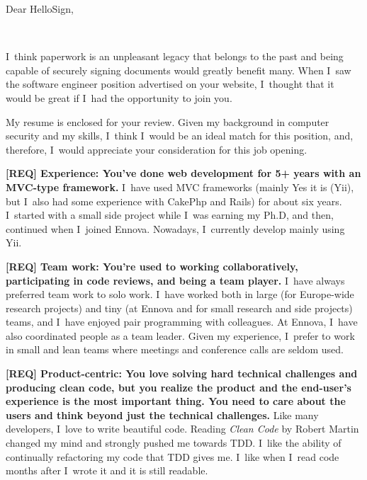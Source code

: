 \documentclass[a4paper,sans]{moderncv} %
\begin{document}
\recipient{~}{~} %
\date{\today} %
\opening{Dear HelloSign,} %
\closing {~}

\makelettertitle %

\justify

I~think paperwork is an unpleasant legacy that belongs to the past and being capable of securely signing documents would greatly benefit many. When I~saw the software engineer position advertised on your website, I~thought that it would be great if I~had the opportunity to join you.

My resume is enclosed for your review. Given my background in computer security and my skills, I~think I~would be an ideal match for this position, and, therefore, I~would appreciate your consideration for this job opening.

\textbf{[REQ] Experience: You’ve done web development for 5+ years with an MVC-type framework.}
I~have used MVC frameworks (mainly Yes it is (Yii), but I~also had some experience with CakePhp and Rails) for about six years. I~started with a small side project while I~was earning my Ph.D, and then, continued when I~joined Ennova. Nowadays, I~currently develop mainly using Yii.

\textbf{[REQ] Team work: You’re used to working collaboratively, participating in code reviews, and being a team player.}
I~have always preferred team work to solo work. I~have worked both in large (for Europe-wide research projects) and tiny (at Ennova and for small research and side projects) teams, and I~have enjoyed pair programming with colleagues. At Ennova, I~have also coordinated people as a team leader.
Given my experience, I~prefer to work in small and lean teams where meetings and conference calls are seldom used.

\textbf{[REQ] Product-centric: You love solving hard technical challenges and producing clean code, but you realize the product and the end-user’s experience is the most important thing. You need to care about the users and think beyond just the technical challenges.}
Like many developers, I~love to write beautiful code. Reading \textit{Clean Code} by Robert Martin changed my mind and strongly pushed me towards TDD. I~like the ability of continually refactoring my code that TDD gives me. I~like when I~read code months after I~wrote it and it is still readable.
\end{document}
